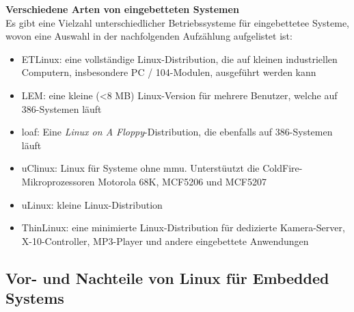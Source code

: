 \textbf{Verschiedene Arten von eingebetteten Systemen}\\

Es gibt eine Vielzahl unterschiedlicher Betriebssysteme für eingebettetee Systeme, wovon eine Auswahl in der nachfolgenden Aufzählung aufgelistet ist:\cite{ibm}
\begin{itemize}
  \item ETLinux: eine vollständige Linux-Distribution, die auf kleinen industriellen Computern, insbesondere PC / 104-Modulen, ausgeführt werden kann
  \item LEM: eine kleine (<8 MB) Linux-Version für mehrere Benutzer, welche auf 386-Systemen läuft
  \item \ac{loaf}: Eine \emph{Linux on A Floppy}-Distribution, die ebenfalls auf 386-Systemen läuft
  \item uClinux: Linux für Systeme ohne \ac{mmu}. Unterstüutzt die ColdFire-Mikroprozessoren Motorola 68K, MCF5206 und MCF5207
  \item uLinux: kleine Linux-Distribution
  \item ThinLinux: eine minimierte Linux-Distribution für dedizierte Kamera-Server, X-10-Controller, MP3-Player und andere eingebettete Anwendungen
\end{itemize}

\subsection{Vor- und Nachteile von Linux für Embedded Systems}\label{kap:vorundnachteilelinux}

